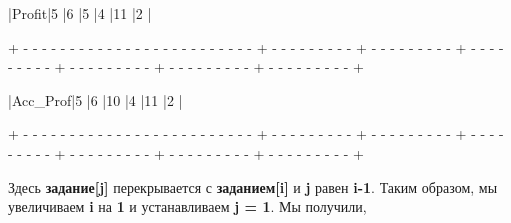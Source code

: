 \begin{tcolorbox}
\hspace{0.4mm}|\hspace{17.6mm}Profit\hspace{17.6mm}|\hspace{7.1mm}5\hspace{7.1mm} |\hspace{7.1mm}6\hspace{7.1mm} |\hspace{7.1mm}5\hspace{7.1mm} |\hspace{7.1mm}4\hspace{7.1mm} |\hspace{5.8mm}11\hspace{5.8mm} |\hspace{7.1mm}2\hspace{7.1mm} |

{\tiny{+ - - - - - - - - - - - - - - - - - - - - - - - - - + - - - - - - - - - + - - - - - - - - - + - - - - - - - - - + - - - - - - - - - + - - - - - - - - - + - - - - - - - - - +}}

\hspace{0.4mm}|\hspace{14mm}Acc\_Prof\hspace{14mm}|\hspace{7.1mm}5\hspace{7.1mm} |\hspace{7.1mm}6\hspace{7.1mm} |\hspace{6mm}10\hspace{6mm} |\hspace{7.1mm}4\hspace{7.1mm} |\hspace{5.8mm}11\hspace{5.8mm} |\hspace{7.1mm}2\hspace{7.1mm} |

{\tiny{+ - - - - - - - - - - - - - - - - - - - - - - - - - + - - - - - - - - - + - - - - - - - - - + - - - - - - - - - + - - - - - - - - - + - - - - - - - - - + - - - - - - - - - +}}
\end{tcolorbox}

\vspace{\baselineskip}
Здесь \textbf{задание[j]} перекрывается с \textbf{заданием[i]} и \textbf{j} равен \textbf{i-1}. Таким образом, мы увеличиваем \textbf{i} на \textbf{1} и устанавливаем \textbf{j = 1}. Мы получили, 

